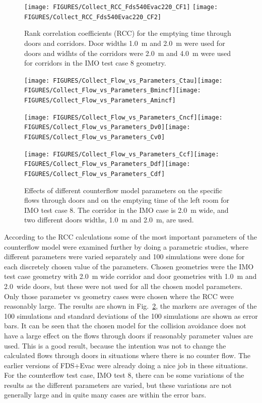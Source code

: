 \documentclass[12pt,a4paper,final,twoside]{stylevk}
\begin{document}
%
\begin{figure}[!tb]
  \centerline{\texttt{[image: FIGURES/Collect\_RCC\_Fds540Evac220\_CF1]}  
      \texttt{[image: FIGURES/Collect\_RCC\_Fds540Evac220\_CF2]} } 
  \caption{Rank correlation coefficients (RCC) for the emptying time
    through doors and corridors.  Door widths 1.0~m and 2.0~m were
    used for doors and widhts of the corridors were 2.0~m and 4.0~m
    were used for corridors in the IMO test case 8
    geometry.}\label{Fig_RCC_CF}
\end{figure}
%

%
\begin{figure}[!ht]
  \centerline{ \texttt{[image: FIGURES/Collect\_Flow\_vs\_Parameters\_Ctau]}\texttt{[image: FIGURES/Collect\_Flow\_vs\_Parameters\_Bmincf]}\texttt{[image: FIGURES/Collect\_Flow\_vs\_Parameters\_Amincf]} }  
  \centerline{ \texttt{[image: FIGURES/Collect\_Flow\_vs\_Parameters\_Cncf]}\texttt{[image: FIGURES/Collect\_Flow\_vs\_Parameters\_Dv0]}\texttt{[image: FIGURES/Collect\_Flow\_vs\_Parameters\_Cv0]} }  
  \centerline{ \texttt{[image: FIGURES/Collect\_Flow\_vs\_Parameters\_Ccf]}\texttt{[image: FIGURES/Collect\_Flow\_vs\_Parameters\_Ddf]}\texttt{[image: FIGURES/Collect\_Flow\_vs\_Parameters\_Cdf]} }  
  \caption{Effects of different counterflow model parameters on the
    specific flows through doors and on the emptying time of the left
    room for IMO test case 8.  The corridor in the IMO case is 2.0~m
    wide, and two different doors widths, 1.0~m and 2.0~m, are
    used.}\label{Fig_CFParametric}
\end{figure}
%

According to the RCC calculations some of the most important
parameters of the counterflow model were examined further by doing a
parametric studies, where different parameters were varied separately
and 100 simulations were done for each discretely chosen value of the
parameters.  Chosen geometries were the IMO test case geometry with
2.0~m wide corridor and door geometries with 1.0~m and 2.0~wide doors,
but these were not used for all the chosen model parameters.  Only
those parameter vs geometry cases were chosen where the RCC were
reasonably large.  The results are shown in
Fig.~\ref{Fig_CFParametric}, the markers are averages of the 100
simulations and standard deviations of the 100 simulations are shown
as error bars.  It can be seen that the chosen model for the collision
avoidance does not have a large effect on the flows through doors if
reasonably parameter values are used.  This is a good result, because
the intention was not to change the calculated flows through doors in
situations where there is no counter flow.  The earlier versions of
FDS+Evac were already doing a nice job in these situations.  For the
counterflow test case, IMO test 8, there can be some variations of the
results as the different parameters are varied, but these variations
are not generally large and in quite many cases are within the error
bars.
\end{document}
